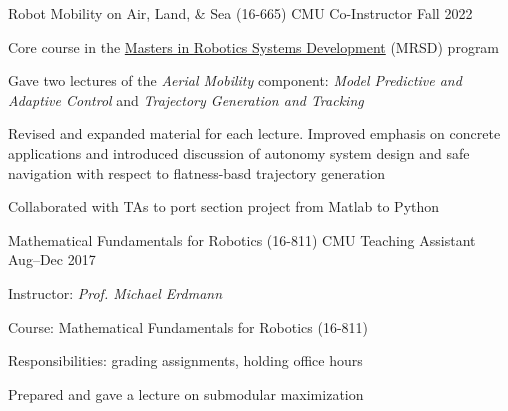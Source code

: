 
\begin{cventries}
  \cventry
  {Robot Mobility on Air, Land, \& Sea (16-665)}
  {CMU}
  {Co-Instructor}
  {Fall 2022}
  {
    \begin{cvitems}
      \item Core course in the \href{https://mrsd.ri.cmu.edu/}{Masters in
        Robotics Systems Development} (MRSD) program
      \item Gave two lectures of the \emph{Aerial Mobility} component:
        \emph{Model Predictive and Adaptive Control}
        and
        \emph{Trajectory Generation and Tracking}
      \item Revised and expanded material for each lecture.
        Improved emphasis on concrete applications and introduced discussion of
        autonomy system design and safe navigation with respect to flatness-basd
        trajectory generation
      \item Collaborated with TAs to port section project from Matlab to Python
    \end{cvitems}
  }
  \cventry
  {Mathematical Fundamentals for Robotics (16-811)}
  {CMU}
  {Teaching Assistant}
  {Aug--Dec 2017}
  {
    Instructor: \emph{Prof. Michael Erdmann}\linebreak
    \begin{cvitems} %
    \item Course: Mathematical Fundamentals for Robotics (16-811)
    \item Responsibilities: grading assignments, holding office hours
    \item Prepared and gave a lecture on submodular maximization
    \end{cvitems}
  }
\end{cventries}

